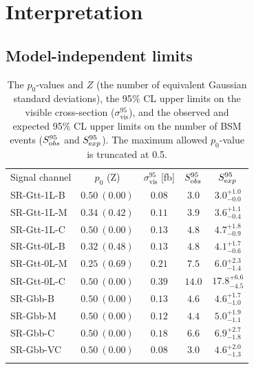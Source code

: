 \clearpage 

\section{Interpretation}

\subsection{Model-independent limits}

\begin{table}[t]
        \centering
        \small
        \begin{tabular*}{0.6\textwidth}{@{\extracolsep{\fill}}lcccc}
                \noalign{\smallskip}\toprule\noalign{\smallskip}
                Signal channel         & $p_0$ (Z)            & $\sigma^{95}_\mathrm{vis}$ [fb]  &  $S_{\textrm obs}^{95}$  & $S_{\textrm exp}^{95}$   \\
                \noalign{\smallskip}\midrule \noalign{\smallskip}
                SR-Gtt-1L-B & $ 0.50~(0.00) $ &  $0.08$ &  $3.0$ & $ { 3.0 }^{ +1.0 }_{ -0.0 }$ \\[1mm]
                SR-Gtt-1L-M & $ 0.34~(0.42)$ &  $0.11$ &  $3.9$ & $ { 3.6 }^{ +1.1 }_{ -0.4 }$ \\[1mm]
                SR-Gtt-1L-C & $ 0.50~(0.00)$ &  $0.13$ &  $4.8$ & $ { 4.7 }^{ +1.8 }_{ -0.9 }$ \\[1mm]
                \noalign{\smallskip}\midrule \noalign{\smallskip}
                SR-Gtt-0L-B & $ 0.32~(0.48)$ & $0.13$ &  $4.8$ & $ { 4.1 }^{ +1.7 }_{ -0.6 }$  \\[1mm]
                SR-Gtt-0L-M & $ 0.25~(0.69)$ &  $0.21$ &  $7.5$ & $ { 6.0 }^{ +2.3 }_{ -1.4 }$ \\[1mm]
                SR-Gtt-0L-C & $ 0.50~(0.00)$ &  $0.39$ &  $14.0$ & $ { 17.8 }^{ +6.6 }_{ -4.5 }$ \\[1mm] %
                \noalign{\smallskip}\midrule\noalign{\smallskip}
                SR-Gbb-B & $ 0.50~(0.00) $ &  $0.13$ &  $4.6$ & $ { 4.6 }^{ +1.7 }_{ -1.0 }$  \\[1mm]
                SR-Gbb-M & $ 0.50~(0.00) $ & $0.12$ &  $4.4$ & $ { 5.0 }^{ +1.9 }_{ -1.1 }$ \\[1mm]
                SR-Gbb-C & $ 0.50~(0.00) $ &  $0.18$ &  $6.6$ & $ { 6.9 }^{ +2.7 }_{ -1.8 }$ \\[1mm]
                SR-Gbb-VC & $ 0.50~(0.00) $ &  $0.08$ &  $3.0$ & $ { 4.6 }^{ +2.0 }_{ -1.3 }$\\
                \noalign{\smallskip}\midrule\noalign{\smallskip}
        \end{tabular*}
                \caption{The $p_0$-values and $Z$ (the number of equivalent Gaussian standard deviations), 
        	the 95$\%$ CL upper limits on the visible cross-section
                ($\sigma^{95}_\mathrm{vis}$),
                and the observed and
                expected 95$\%$ CL upper limits on the number of BSM events ($S_{\textrm
                obs}^{95}$ and $S_{\textrm exp}^{95}$). The maximum
              allowed $p_0$-value
              is truncated at 0.5.}
        \label{mod-ind-lim}
\end{table}

